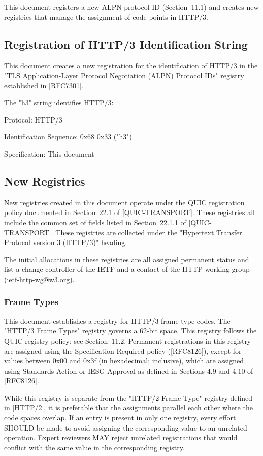 \documentclass{article}
\begin{document}
This document registers a new ALPN protocol ID (Section~11.1) and creates new registries that manage the assignment of code points in HTTP/3.

\subsection{Registration of HTTP/3 Identification String}

This document creates a new registration for the identification of HTTP/3 in the "TLS Application-Layer Protocol Negotiation (ALPN) Protocol IDs" registry established in [RFC7301].

The "h3" string identifies HTTP/3:

Protocol:  HTTP/3

Identification Sequence:  0x68 0x33 ("h3")

Specification:  This document

\subsection{New Registries}

New registries created in this document operate under the QUIC registration policy documented in Section~22.1 of [QUIC-TRANSPORT]. These registries all include the common set of fields listed in Section~22.1.1 of [QUIC-TRANSPORT].  These registries are collected under the "Hypertext Transfer Protocol version 3 (HTTP/3)" heading.

The initial allocations in these registries are all assigned permanent status and list a change controller of the IETF and a contact of the HTTP working group (ietf-http-wg@w3.org).

\subsubsection{Frame Types}

This document establishes a registry for HTTP/3 frame type codes. The "HTTP/3 Frame Types" registry governs a 62-bit space.  This registry follows the QUIC registry policy; see Section~11.2. Permanent registrations in this registry are assigned using the Specification Required policy ([RFC8126]), except for values between 0x00 and 0x3f (in hexadecimal; inclusive), which are assigned using Standards Action or IESG Approval as defined in Sections 4.9 and 4.10 of [RFC8126].

While this registry is separate from the "HTTP/2 Frame Type" registry defined in [HTTP/2], it is preferable that the assignments parallel each other where the code spaces overlap.  If an entry is present in only one registry, every effort SHOULD be made to avoid assigning the corresponding value to an unrelated operation.  Expert reviewers MAY reject unrelated registrations that would conflict with the same value in the corresponding registry.
\end{document}
